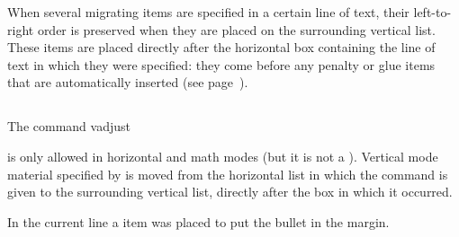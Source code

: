 \documentclass{book}
\begin{document}
When several migrating items are specified in a certain line
of text, their left-to-right order is preserved when they are
placed on the surrounding vertical list. These items are placed
directly after the horizontal box containing the line of text
in which they were specified: they come before any
penalty or glue items that are automatically inserted
(see page~\pageref{between:lines}).

\subsection{}

The command
\cstoidx vadjust\par
\begin{disp}\lb{}\rb\end{disp}
is only allowed in horizontal and math modes (but it is
not a ).
Vertical mode material specified by  is moved from
the horizontal list in which the command is given
to the surrounding vertical list, directly after the box
in which it occurred.

In the current line
a  item was placed to put the bullet in the margin.
\end{document}

